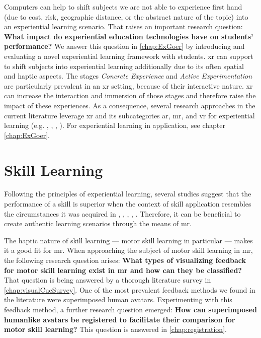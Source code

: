 Computers can help to shift subjects we are not able to experience first hand (due to cost, risk, geographic distance, or the abstract nature of the topic) into an experiential learning scenario.
That raises an important research question: \textbf{What impact do experiential education technologies have on students' performance?}
We answer this question in \autoref{chap:ExGoer} by introducing and evaluating a novel experiential learning framework with students.
\Acrshort{xr} can support to shift subjects into experiential learning additionally due to its often spatial and haptic aspects.
The stages \emph{Concrete Experience} and \emph{Active Experimentation} are particularly prevalent in an \acrshort{xr} setting, because of their interactive nature.
\acrshort{xr} can increase the interaction and immersion of those stages and therefore raise the impact of these experiences.
As a consequence, several research approaches in the current literature leverage \acrshort{xr} and its subcategories \acrshort{ar}, \acrshort{mr}, and \acrshort{vr} for experiential learning (e.g. \cite{asad2021virtual}, \cite{majgaard2020virtual}, \cite{wang2007experiential}, \cite{pueschel:2013:MRCG}).
For experiential learning in application, see chapter \autoref{chap:ExGoer}.

\section{Skill Learning \label{sec:skill}}
Following the principles of experiential learning, several studies suggest that the performance of a skill is superior when the context of skill application resembles the circumstances it was acquired in \cite{godden1975context}, \cite{ruitenberg2012context}, \cite{smith2001environmental}, \cite{anderson1998contextual}, \cite{wright1991contextual}.
Therefore, it can be beneficial to create authentic learning scenarios through the means of \acrshort{mr}.

The haptic nature of skill learning --- motor skill learning in particular --- makes it a good fit for \acrshort{mr}.
When approaching the subject of motor skill learning in \acrshort{mr}, the following research question arises: \textbf{What types of visualizing feedback for motor skill learning exist in \acrlong{mr} and how can they be classified?}
That question is being answered by a thorough literature survey in \autoref{chap:visualCueSurvey}.
One of the most prevalent feedback methods we found in the literature were superimposed human avatars.
Experimenting with this feedback method, a further research question emerged: \textbf{How can superimposed humanlike avatars be registered to facilitate their comparison for motor skill learning?}
This question is answered in \autoref{chap:registration}.

